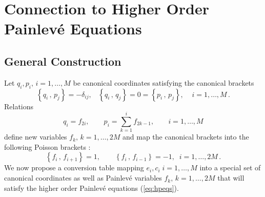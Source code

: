 \documentclass[12pt]{article}
\numberwithin{equation}{section}
\def\rf#1{(\ref{eq:#1})}
\def\lab#1{\label{eq:#1}}
\begin{document}
\section{Connection to Higher Order Painlev\'e Equations}
\label{section:connection}
\subsection{General Construction}
\label{subsect:generalconstruct}
Let $q_i, p_i, \, i=1,{\ldots} ,M$ be canonical coordinates 
satisfying the  canonical brackets
\[
\left\{ q_i\, , \, p_{j} \right\} =  -\delta_{ij}, \;\;\;
\left\{ q_i\, , \, q_{j} \right\} = 0=
\left\{ p_i\, , \, p_{j} \right\}, \;\;\;\; i=1,{\ldots} ,M\, .
\]
Relations 
\begin{equation}
q_i = f_{2i}, \qquad p_i= \sum_{k=1}^i f_{2k-1},\;\;\;\;\;\;\;  i=1,{\ldots} ,M
\lab{pqtof}
\end{equation}
define new variables $f_k, \, k=1, {\ldots} ,2M$ and map
the canonical brackets into the following Poisson brackets :
\[
\left\{ f_i\, , \, f_{i+1} \right\} = 1, \qquad
\left\{ f_i\, , \, f_{i-1} \right\} =  -1, \;\; i=1,{\ldots} ,2M\, .
\]
We now propose a conversion table
mapping $e_i, c_i \; i=1, {\ldots}, M$
into a special set of canonical coordinates as well as  
Painlev\'e variables $f_k, \, k=1, {\ldots} ,2M$ that will satisfy 
the higher order Painlev\'e equations \rf{hpeqs}.
\end{document}
